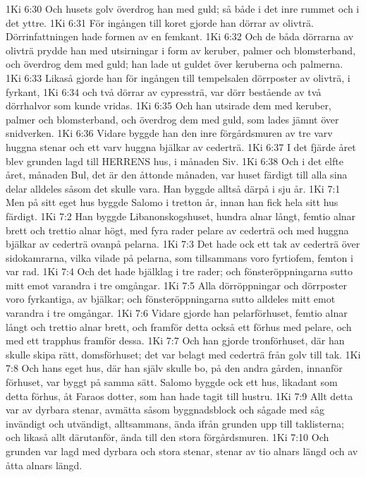 1Ki 6:30  Och husets golv överdrog han med guld; så både i det inre rummet och i det yttre.
1Ki 6:31  För ingången till koret gjorde han dörrar av olivträ. Dörrinfattningen hade formen av en femkant.
1Ki 6:32  Och de båda dörrarna av olivträ prydde han med utsirningar i form av keruber, palmer och blomsterband, och överdrog dem med guld; han lade ut guldet över keruberna och palmerna.
1Ki 6:33  Likaså gjorde han för ingången till tempelsalen dörrposter av olivträ, i fyrkant,
1Ki 6:34  och två dörrar av cypressträ, var dörr bestående av två dörrhalvor som kunde vridas.
1Ki 6:35  Och han utsirade dem med keruber, palmer och blomsterband, och överdrog dem med guld, som lades jämnt över snidverken.
1Ki 6:36  Vidare byggde han den inre förgårdsmuren av tre varv huggna stenar och ett varv huggna bjälkar av cederträ.
1Ki 6:37  I det fjärde året blev grunden lagd till HERRENS hus, i månaden Siv.
1Ki 6:38  Och i det elfte året, månaden Bul, det är den åttonde månaden, var huset färdigt till alla sina delar alldeles såsom det skulle vara. Han byggde alltså därpå i sju år.
1Ki 7:1  Men på sitt eget hus byggde Salomo i tretton år, innan han fick hela sitt hus färdigt.
1Ki 7:2  Han byggde Libanonskogshuset, hundra alnar långt, femtio alnar brett och trettio alnar högt, med fyra rader pelare av cederträ och med huggna bjälkar av cederträ ovanpå pelarna.
1Ki 7:3  Det hade ock ett tak av cederträ över sidokamrarna, vilka vilade på pelarna, som tillsammans voro fyrtiofem, femton i var rad.
1Ki 7:4  Och det hade bjälklag i tre rader; och fönsteröppningarna sutto mitt emot varandra i tre omgångar.
1Ki 7:5  Alla dörröppningar och dörrposter voro fyrkantiga, av bjälkar; och fönsteröppningarna sutto alldeles mitt emot varandra i tre omgångar.
1Ki 7:6  Vidare gjorde han pelarförhuset, femtio alnar långt och trettio alnar brett, och framför detta också ett förhus med pelare, och med ett trapphus framför dessa.
1Ki 7:7  Och han gjorde tronförhuset, där han skulle skipa rätt, domsförhuset; det var belagt med cederträ från golv till tak.
1Ki 7:8  Och hans eget hus, där han själv skulle bo, på den andra gården, innanför förhuset, var byggt på samma sätt. Salomo byggde ock ett hus, likadant som detta förhus, åt Faraos dotter, som han hade tagit till hustru.
1Ki 7:9  Allt detta var av dyrbara stenar, avmätta såsom byggnadsblock och sågade med såg invändigt och utvändigt, alltsammans, ända ifrån grunden upp till taklisterna; och likaså allt därutanför, ända till den stora förgårdsmuren.
1Ki 7:10  Och grunden var lagd med dyrbara och stora stenar, stenar av tio alnars längd och av åtta alnars längd.
